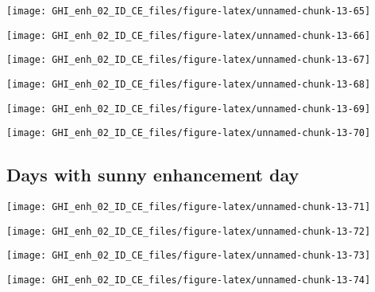 \documentclass[
  10pt,
  a4paper,oneside]{article}
\begin{document}
\begin{center}\texttt{[image: GHI\_enh\_02\_ID\_CE\_files/figure-latex/unnamed-chunk-13-65]} \end{center}

\begin{center}\texttt{[image: GHI\_enh\_02\_ID\_CE\_files/figure-latex/unnamed-chunk-13-66]} \end{center}

\begin{center}\texttt{[image: GHI\_enh\_02\_ID\_CE\_files/figure-latex/unnamed-chunk-13-67]} \end{center}

\begin{center}\texttt{[image: GHI\_enh\_02\_ID\_CE\_files/figure-latex/unnamed-chunk-13-68]} \end{center}

\begin{center}\texttt{[image: GHI\_enh\_02\_ID\_CE\_files/figure-latex/unnamed-chunk-13-69]} \end{center}

\begin{center}\texttt{[image: GHI\_enh\_02\_ID\_CE\_files/figure-latex/unnamed-chunk-13-70]} \end{center}

\FloatBarrier

\hypertarget{days-with-sunny-enhancement-day}{%
\subsection{Days with sunny enhancement day}\label{days-with-sunny-enhancement-day}}

\begin{center}\texttt{[image: GHI\_enh\_02\_ID\_CE\_files/figure-latex/unnamed-chunk-13-71]} \end{center}

\begin{center}\texttt{[image: GHI\_enh\_02\_ID\_CE\_files/figure-latex/unnamed-chunk-13-72]} \end{center}

\begin{center}\texttt{[image: GHI\_enh\_02\_ID\_CE\_files/figure-latex/unnamed-chunk-13-73]} \end{center}

\begin{center}\texttt{[image: GHI\_enh\_02\_ID\_CE\_files/figure-latex/unnamed-chunk-13-74]} \end{center}
\end{document}

